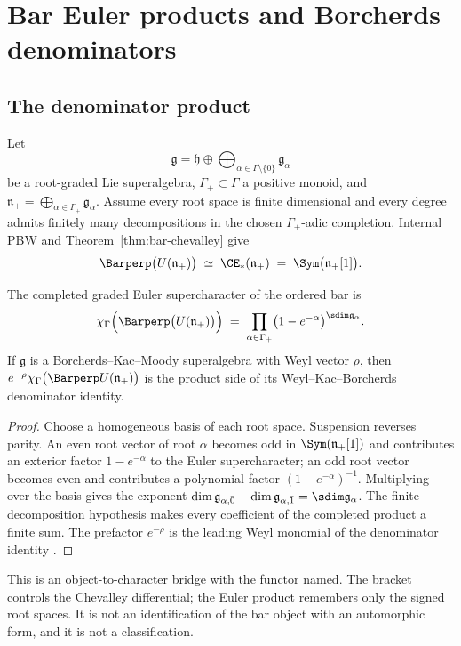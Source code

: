 \chapter{Bar Euler products and Borcherds denominators}
\label{ch:bar-denominators}

\section{The denominator product}

Let
\[
  \mathfrak g = \mathfrak h \oplus
  \bigoplus_{\alpha\in\Gamma\setminus\{0\}} \mathfrak g_\alpha
\]
be a root-graded Lie superalgebra, $\Gamma_+\subset\Gamma$ a positive
monoid, and $\mathfrak n_+=\bigoplus_{\alpha\in\Gamma_+}\mathfrak
g_\alpha$. Assume every root space is finite dimensional and every degree
admits finitely many decompositions in the chosen $\Gamma_+$-adic
completion. Internal PBW and Theorem~\ref{thm:bar-chevalley} give
\[
  \Barperp\bigl(U(\mathfrak n_+)\bigr)
  \;\simeq\; \CE_*(\mathfrak n_+)
  \;=\; \Sym\bigl(\mathfrak n_+[1]\bigr).
\]

\begin{theorem}
\label{thm:bar-denominator}
\StatusProved{} The completed graded Euler supercharacter of the ordered
bar is
\[
  \chi_\Gamma\Bigl(\Barperp\bigl(U(\mathfrak n_+)\bigr)\Bigr)
  \;=\;
  \prod_{\alpha\in\Gamma_+}\bigl(1-e^{-\alpha}\bigr)^{\sdim\mathfrak g_\alpha}.
\]
If $\mathfrak g$ is a Borcherds--Kac--Moody superalgebra with Weyl vector
$\rho$, then $e^{-\rho}\chi_\Gamma\bigl(\Barperp U(\mathfrak n_+)\bigr)$
is the product side of its Weyl--Kac--Borcherds denominator identity.
\end{theorem}

\begin{proof}
Choose a homogeneous basis of each root space. Suspension reverses parity.
An even root vector of root $\alpha$ becomes odd in $\Sym(\mathfrak
n_+[1])$ and contributes an exterior factor $1-e^{-\alpha}$ to the Euler
supercharacter; an odd root vector becomes even and contributes a
polynomial factor $(1-e^{-\alpha})^{-1}$. Multiplying over the basis gives
the exponent $\dim\mathfrak g_{\alpha,\bar0}-\dim\mathfrak
g_{\alpha,\bar1}=\sdim\mathfrak g_\alpha$. The finite-decomposition
hypothesis makes every coefficient of the completed product a finite sum.
The prefactor $e^{-\rho}$ is the leading Weyl monomial of the denominator
identity \cite{Bor88,Kac90}.
\end{proof}

This is an object-to-character bridge with the functor named. The bracket
controls the Chevalley differential; the Euler product remembers only the
signed root spaces. It is not an identification of the bar object with an
automorphic form, and it is not a classification.

